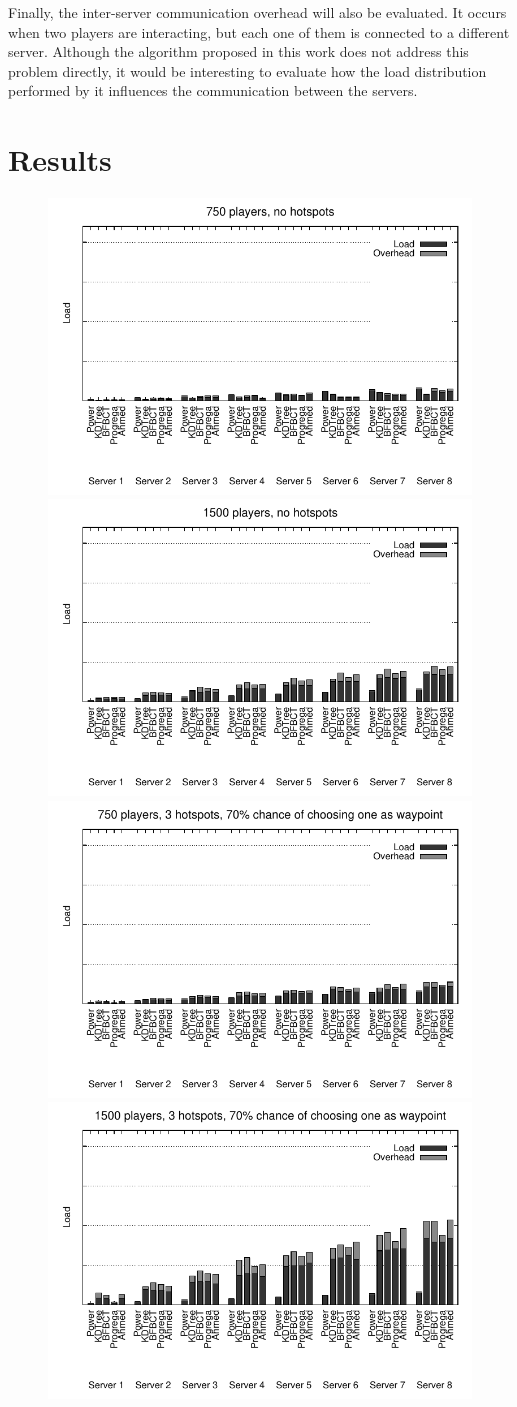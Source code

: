 \documentclass[acmjacm]{acmtrans2m}
\begin{document}
Finally, the inter-server communication overhead will also be evaluated. It occurs when two players are interacting, but each one of them is connected to a different server. Although the algorithm proposed in this work does not address this problem directly, it would be interesting to evaluate how the load distribution performed by it influences the communication between the servers.

\section{Results}
\label{sec:result}

\begin{figure}[!t]
	\centering
	\includegraphics[width=0.49\linewidth]{data/750players_prob0/distribution_750_0}
	\includegraphics[width=0.49\linewidth]{data/1500players_prob0/distribution_1500_0}
	\includegraphics[width=0.49\linewidth]{data/750players_prob70/distribution_750_70}
	\includegraphics[width=0.49\linewidth]{data/1500players_prob70/distribution_1500_70}

\end{figure}
\end{document}
